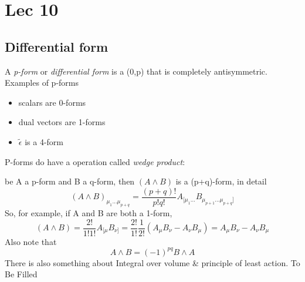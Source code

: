 \section{Lec 10}
\subsection{Differential form}
A \emph{p-form} or \emph{differential form} is a (0,p) that is completely antisymmetric.
Examples of p-forms
\begin{itemize}
	\item scalars are 0-forms
	\item dual vectors are 1-forms
	\item $\tilde{\epsilon }$ is a 4-form
\end{itemize}
P-forms do have a operation called \emph{wedge product}:\par
be A a p-form and B a q-form, then $\left( A \wedge B \right)$ is a (p+q)-form, in detail
\[
	\left( A \wedge B \right)_{\mu _{1}\ldots \mu _{p+q}} = \frac{\left( p+q \right)!}{p!q!} A_{[\mu _{1}\ldots }B_{\mu _{p+1}\ldots \mu _{p+q}]}
\]
So, for example, if A and B are both a 1-form,
\[
	\left( A \wedge B \right) = \frac{2!}{1!1!} A_{[\mu }B_{\nu ]} = \frac{2!}{1!} \frac{1}{2!} \left( A_{\mu }B_{\nu }-A_{\nu }B_{\mu } \right) = A_{\mu }B_{\nu }-A_{\nu }B_{\mu }	
\]
Also note that
\[
A\wedge B = \left( -1 \right)^{pq} B\wedge A	
\]
There is also something about Integral over volume \& principle of least action. To Be Filled

